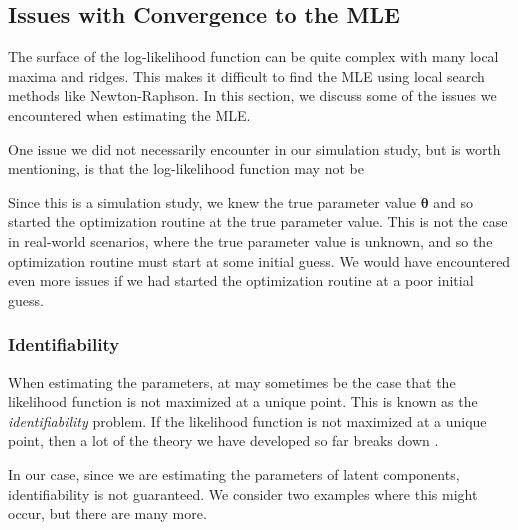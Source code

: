 \documentclass[
]{article}
\begin{document}
\hypertarget{sec:opt_rescale}{%
\subsection{Issues with Convergence to the MLE}\label{sec:opt_rescale}}

The surface of the log-likelihood function can be quite complex with
many local maxima and ridges. This makes it difficult to find the MLE
using local search methods like Newton-Raphson. In this section, we
discuss some of the issues we encountered when estimating the MLE.

One issue we did not necessarily encounter in our simulation study, but
is worth mentioning, is that the log-likelihood function may not be

Since this is a simulation study, we knew the true parameter value
\(\boldsymbol{\theta}\) and so started the optimization routine at the
true parameter value. This is not the case in real-world scenarios,
where the true parameter value is unknown, and so the optimization
routine must start at some initial guess. We would have encountered even
more issues if we had started the optimization routine at a poor initial
guess.

\hypertarget{identifiability}{%
\subsubsection*{Identifiability}\label{identifiability}}

When estimating the parameters, at may sometimes be the case that the
likelihood function is not maximized at a unique point. This is known as
the \emph{identifiability} problem. If the likelihood function is not
maximized at a unique point, then a lot of the theory we have developed
so far breaks down \citep{mclachlan2007algorithm}.

In our case, since we are estimating the parameters of latent
components, identifiability is not guaranteed. We consider two examples
where this might occur, but there are many more.
\end{document}
